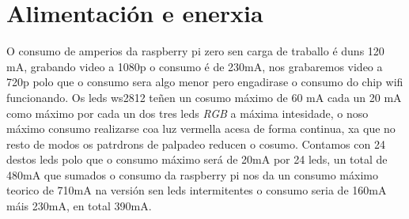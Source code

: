 \section{Alimentación e enerxia}
O consumo de amperios da raspberry pi zero sen carga de traballo é duns 120 mA, grabando video a 1080p o consumo é de 230mA, nos grabaremos video a 720p polo que o consumo sera algo menor pero engadirase o consumo do chip wifi funcionando. Os leds ws2812 teñen un cosumo máximo de 60 mA cada un 20 mA como máximo por cada un dos tres leds \emph{RGB} a máxima intesidade, o noso máximo consumo realizarse coa luz vermella acesa de forma continua, xa que no resto de modos os patrdrons de palpadeo reducen o cosumo. Contamos con 24 destos leds polo que o consumo máximo será de 20mA por 24 leds, un total de 480mA que sumados o consumo da raspberry pi nos da un consumo máximo teorico de 710mA na versión sen leds intermitentes o consumo seria de 160mA máis 230mA, en total 390mA.

